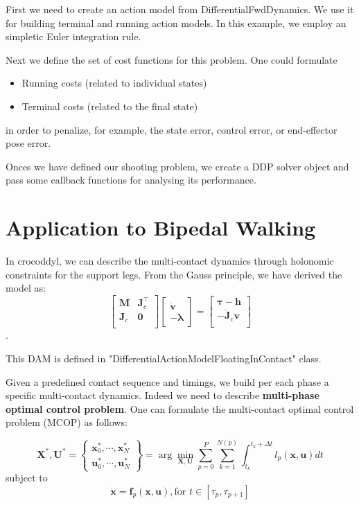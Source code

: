 First we need to create an action model from DifferentialFwdDynamics. We use it for building terminal and running action models. In this example, we employ an simpletic Euler integration rule.

Next we define the set of cost functions for this problem. One could formulate
\begin{itemize}
\item Running costs (related to individual states)
\item Terminal costs (related to the final state)
\end{itemize}
in order to penalize, for example, the state error, control error, or end-effector pose error. 

Onces we have defined our shooting problem, we create a DDP solver object and pass some callback functions for analysing its performance.


\section{Application to Bipedal Walking}
In crocoddyl, we can describe the multi-contact dynamics through holonomic constraints for the support legs. From the Gauss principle, we have derived the model as:
$$
\left[\begin{matrix}
 \mathbf{M} & \mathbf{J}^{\top}_c \\
 {\mathbf{J}_{c}} & \mathbf{0} \\
\end{matrix}\right]
\left[\begin{matrix}
 \dot{\mathbf{v}} \\ -\boldsymbol{\lambda}
\end{matrix}\right]
 = 
\left[\begin{matrix}
  \boldsymbol{\tau} - \mathbf{h} \\
  -\dot{\mathbf{J}}_c \mathbf{v} \\
\end{matrix}\right]$$.

This DAM is defined in "DifferentialActionModelFloatingInContact" class.

Given a predefined contact sequence and timings, we build per each phase a specific multi-contact dynamics. Indeed we need to describe \textbf{multi-phase optimal control problem}. One can formulate the multi-contact optimal control problem (MCOP) as follows:

$$\mathbf{X}^*,\mathbf{U}^*=
\begin{Bmatrix} \mathbf{x}^*_0,\cdots,\mathbf{x}^*_N \\
				  \mathbf{u}^*_0,\cdots,\mathbf{u}^*_N
\end{Bmatrix} =
\arg\min_{\mathbf{X},\mathbf{U}} \sum_{p=0}^P \sum_{k=1}^{N(p)} \int_{t_k}^{t_k+\Delta t} l_p(\mathbf{x},\mathbf{u})dt$$
subject to
$$ \mathbf{\dot{x}} = \mathbf{f}_p(\mathbf{x},\mathbf{u}), \text{for } t \in [\tau_p,\tau_{p+1}]$$

